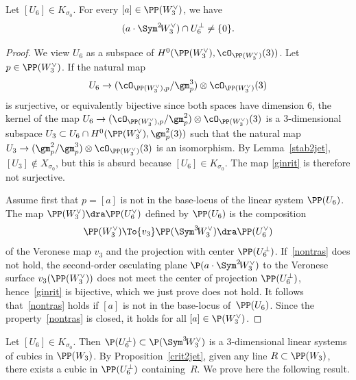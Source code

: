 \begin{prop}\label{crit2jet}
Let $[U_6]\in K_{\sigma_0}$. For every $[a]\in \PP(W_3^{\vee})$, we have
\begin{equation}\label{nontras}
(a\cdot \Sym^2\! W_3^{\vee})\cap U_6^{\bot}\ne \{0\}.
\end{equation}
\end{prop}

\begin{proof}
We view $U_6$ as a subspace of $H^0(\PP(W_3^{\vee}),\cO_{\PP(W_3^{\vee})}(3))$. Let $p\in\PP(W_3^{\vee})$. If the natural map
\begin{equation}\label{ginrit}
U_6\to (\cO_{\PP(W_3^{\vee}),p}/\gm_{p}^3 )\otimes \cO_{\PP(W_3^{\vee})}(3)
\end{equation}
is surjective, or equivalently bijective since both spaces have dimension $6$, the kernel of the map $U_6\to (\cO_{\PP(W_3^{\vee}),p}/\gm_{p}^2) \otimes \cO_{\PP(W_3^{\vee})}(3)$ is a $3$-dimensional subspace $U_3\subset U_6\cap H^0(\PP(W_3^{\vee}),\gm_{p}^2(3))$ such that the natural map $U_3\to (\gm_p^2/ \gm_p^3)\otimes \cO_{\PP(W_3^{\vee})}(3)$ is an isomorphism. By Lemma~\ref{stab2jet}, $[U_3]\notin X_{\sigma_0}$, but this is absurd because $[U_6]\in K_{\sigma_0}$. The map \eqref{ginrit} is therefore not surjective.

Assume first that $p=[a]$ is not in the base-locus of the linear system $\PP(U_6)$. The map $\PP(W_3^{\vee})\dra \PP(U_6^{\vee})$ defined by $\PP(U_6)$ is the composition
\[
\PP(W_3^{\vee}) \To{v_3}
\PP(\Sym^3\! W^{\vee}_3) \dra \PP(U_6^{\vee})
\]
of the Veronese map $v_3$ and the projection with center $\PP(U_6^{\bot})$. If~\eqref{nontras} does not hold, the second-order osculating plane $\P(a\cdot \Sym^2\! W_3^{\vee})$ to the Veronese surface $v_3(\PP(W_3^{\vee}))$ does not meet the center of projection $\PP(U_6^{\bot})$, hence~\eqref{ginrit} is bijective, which we just prove does not hold. It follows that~\eqref{nontras} holds if
$[a]$ is not in the base-locus of~$\PP(U_6)$. Since the property~\eqref{nontras} is closed, it holds for all $[a]\in \P(W_3^{\vee})$.
\end{proof}

Let $[U_6]\in K_{\sigma_0}$. Then $\P(U^{\bot}_6)\subset \P(\Sym^3\! W_3^{\vee})$ is a $3$-dimensional linear systems of cubics in $\PP(W_3)$. By Proposition~\ref{crit2jet}, given any line $R\subset \PP(W_3)$, there exists a cubic in $\PP(U^{\bot}_6)$ containing~$R$. We prove here the following result.

